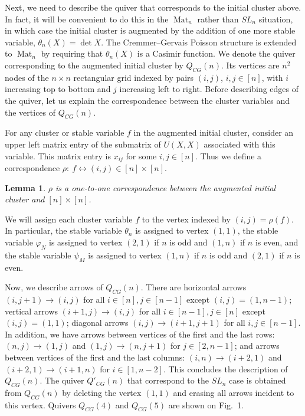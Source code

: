 \documentclass{amsart}
\newtheorem{lemma}[theorem]{Lemma}
\theoremstyle{definition}
\theoremstyle{remark}
\numberwithin{equation}{section}
\numberwithin{theorem}{section}
\begin{document}
Next, we need to describe the quiver  that corresponds to the initial cluster above. 
In fact, it will be convenient to do this in the ${\operatorname{Mat}}_n$ rather than $SL_n$ situation, in
which case the initial cluster is augmented by the  addition of one more stable
variable, 
${{\theta}}_n(X)=\det X$. The Cremmer--Gervais Poisson structure is extended to ${\operatorname{Mat}}_n$
by requiring that ${{\theta}}_n(X)$ is a Casimir function.
We denote the quiver corresponding to the augmented initial cluster by $Q_{CG}(n)$.
Its vertices are $n^2$ nodes of the $n\times n$ rectangular grid indexed by pairs
$(i,j)$, $i, j \in [n]$, with $i$ increasing top to bottom and $j$ increasing left
to right. Before
describing  edges of the quiver, let us explain the correspondence between the
cluster variables and the vertices of $Q_{CG}(n)$.

For any cluster or stable variable $f$ in the augmented initial cluster, consider an upper
left matrix
entry of the submatrix of $U(X,X)$ associated with this variable. This
matrix entry is $x_{ij}$ for some $i, j \in [n]$. 
Thus we define a correspondence  $\rho {{:\ }} f \leftrightarrow (i,j)\in
[n]\times [n]$.

\begin{lemma}
\label{vertices}
$\rho$ is a one-to-one correspondence between the augmented initial cluster and
$[n]\times [n]$.
\end{lemma}

We will assign each cluster variable $f$ to the vertex indexed by $(i,j) = \rho(f)$.
In particular, the stable variable ${{\theta}}_n$ is assigned to vertex $(1,1)$, 
 the stable variable ${{\varphi}}_N$ is assigned to vertex $(2,1)$ if $n$ is odd and $(1,n)$
 if $n$ is even, and  the stable variable ${{\psi}}_M$ is assigned to vertex $(1,n)$ if
$n$ is odd and $(2,1)$
 if $n$ is even.

Now, we describe arrows of $Q_{CG}(n)$. There are horizontal arrows
$(i,j+1) \to (i,j)$ for  all $i \in [n], j\in [n-1]$ except $(i,j)=(1, n-1)$;
vertical arrows
$(i+1,j) \to (i,j)$ for  all $i \in [n-1], j\in [n]$ except $(i,j)=(1,1)$; 
diagonal arrows $(i,j) \to (i+1,j+1)$ for  all $i, j\in [n-1]$.
In addition, we have arrows between vertices of the first and the last rows:
$(n,j) \to (1,j)$ and $(1,j) \to (n,j+1)$ for $j\in [2, n-1]$;  and 
 arrows between vertices of the first and the last columns:
$(i,n) \to (i+2,1)$ and $(i+2,1) \to (i+1, n)$ for $i\in [1, n-2]$. This
concludes the description of $Q_{CG}(n)$. The quiver  $Q'_{CG}(n)$ that correspond to the
$SL_n$ case is obtained
from $Q_{CG}(n)$ by deleting the vertex $(1,1)$ and erasing all arrows incident to this
vertex. Quivers $Q_{CG}(4)$ and $Q_{CG}(5)$ are shown on Fig.~1.
\end{document}
